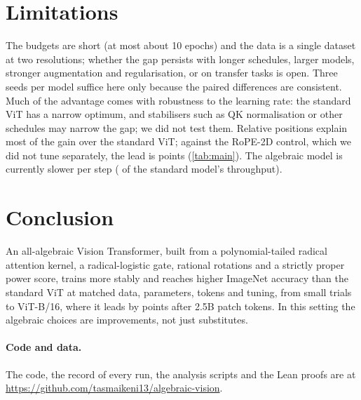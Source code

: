 \documentclass[10pt]{article}
\begin{document}
\section{Limitations}

The budgets are short (at most about 10 epochs) and the data is a single
dataset at two resolutions; whether the gap persists with longer schedules,
larger models, stronger augmentation and regularisation, or on transfer
tasks is open. Three seeds per model suffice here only because the paired
differences are consistent. Much of the advantage comes with robustness to
the learning rate: the standard ViT has a narrow optimum, and stabilisers
such as QK normalisation \cite{dehghani2023vit22b} or other schedules may
narrow the gap; we did not test them. Relative positions explain most of
the gain over the standard ViT; against the RoPE-2D control, which we did
not tune separately, the lead is \mainAlgRopeDiff{} points
(\cref{tab:main}). The algebraic model is currently slower per step
(\mainSpeedRatio{} of the standard model's throughput).

\section{Conclusion}

An all-algebraic Vision Transformer, built from a polynomial-tailed radical
attention kernel, a radical-logistic gate, rational rotations and a strictly
proper power score, trains more stably and reaches higher ImageNet accuracy
than the standard ViT at matched data, parameters, tokens and tuning, from
small trials to ViT-B/16, where it leads by \mainDiff{} points after 2.5B
patch tokens. In this setting the algebraic choices are improvements, not
just substitutes.

\paragraph{Code and data.} The code, the record of every run, the analysis
scripts and the Lean proofs are at
\url{https://github.com/tasmaikeni13/algebraic-vision}.



\end{document}
